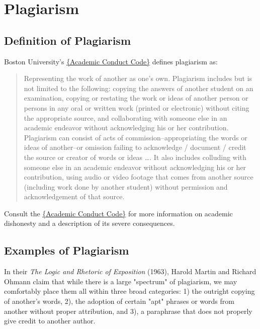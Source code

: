 

\chapter{Plagiarism}

\section{Definition of Plagiarism}

Boston University's \href{http://www.bu.edu/academics/resources/academic-conduct-code}{\{Academic Conduct Code\}}  defines plagiarism as:

\begin{quote}Representing the work of another as one's own. Plagiarism includes but is 
not limited to the following: copying the answers of another student on an examination,
 copying or restating the work or ideas of another person or persons in any oral or 
written work (printed or electronic) without citing the appropriate source, and 
collaborating with someone else in an academic endeavor without acknowledging his or 
her contribution. Plagiarism can consist of acts of commission--appropriating the words 
or ideas of another--or omission failing to acknowledge / document / credit the source 
or creator of words or ideas \dots. It also includes colluding with someone else in an 
academic endeavor without acknowledging his or her contribution, using audio or video 
footage that comes from another source (including work done by another student) 
without permission and acknowledgement of that source.
\end{quote}

Consult the \href{http://www.bu.edu/academics/resources/academic-conduct-code}{\{Academic Conduct Code\}} 
for more information on academic dishonesty and a description of its severe consequences.

\section{Examples of Plagiarism}

In their \emph{The Logic and Rhetoric of Exposition} (1963), Harold Martin and Richard
Ohmann claim that while there is a large "spectrum" of plagiarism, we may comfortably
place them all within three broad categories: 1) the outright copying of another's words, 
2), the adoption of certain "apt" phrases or words from another without proper attribution, 
and 3), a paraphrase that does not properly give credit to another author. 

